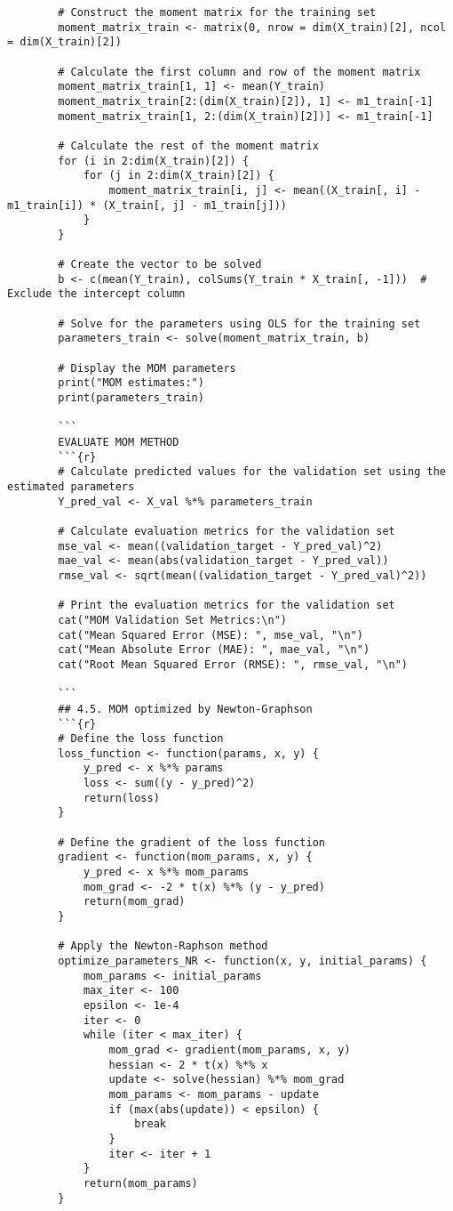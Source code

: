 \documentclass[12pt]{article}
\begin{document}
\begin{lstlisting}
		# Construct the moment matrix for the training set
		moment_matrix_train <- matrix(0, nrow = dim(X_train)[2], ncol = dim(X_train)[2])
		
		# Calculate the first column and row of the moment matrix
		moment_matrix_train[1, 1] <- mean(Y_train)
		moment_matrix_train[2:(dim(X_train)[2]), 1] <- m1_train[-1]
		moment_matrix_train[1, 2:(dim(X_train)[2])] <- m1_train[-1]
		
		# Calculate the rest of the moment matrix
		for (i in 2:dim(X_train)[2]) {
			for (j in 2:dim(X_train)[2]) {
				moment_matrix_train[i, j] <- mean((X_train[, i] - m1_train[i]) * (X_train[, j] - m1_train[j]))
			}
		}
		
		# Create the vector to be solved
		b <- c(mean(Y_train), colSums(Y_train * X_train[, -1]))  # Exclude the intercept column
		
		# Solve for the parameters using OLS for the training set
		parameters_train <- solve(moment_matrix_train, b)
		
		# Display the MOM parameters
		print("MOM estimates:")
		print(parameters_train)
		
		```
		EVALUATE MOM METHOD
		```{r}
		# Calculate predicted values for the validation set using the estimated parameters
		Y_pred_val <- X_val %*% parameters_train
		
		# Calculate evaluation metrics for the validation set 
		mse_val <- mean((validation_target - Y_pred_val)^2)
		mae_val <- mean(abs(validation_target - Y_pred_val))
		rmse_val <- sqrt(mean((validation_target - Y_pred_val)^2))
		
		# Print the evaluation metrics for the validation set
		cat("MOM Validation Set Metrics:\n")
		cat("Mean Squared Error (MSE): ", mse_val, "\n")
		cat("Mean Absolute Error (MAE): ", mae_val, "\n")
		cat("Root Mean Squared Error (RMSE): ", rmse_val, "\n")
		
		```
		## 4.5. MOM optimized by Newton-Graphson 
		```{r}
		# Define the loss function
		loss_function <- function(params, x, y) {
			y_pred <- x %*% params
			loss <- sum((y - y_pred)^2)
			return(loss)
		}
		
		# Define the gradient of the loss function
		gradient <- function(mom_params, x, y) {
			y_pred <- x %*% mom_params
			mom_grad <- -2 * t(x) %*% (y - y_pred)
			return(mom_grad)
		}
		
		# Apply the Newton-Raphson method
		optimize_parameters_NR <- function(x, y, initial_params) {
			mom_params <- initial_params
			max_iter <- 100
			epsilon <- 1e-4
			iter <- 0
			while (iter < max_iter) {
				mom_grad <- gradient(mom_params, x, y)
				hessian <- 2 * t(x) %*% x
				update <- solve(hessian) %*% mom_grad
				mom_params <- mom_params - update
				if (max(abs(update)) < epsilon) {
					break
				}
				iter <- iter + 1
			}
			return(mom_params)
		}
		

\end{lstlisting}
\end{document}
